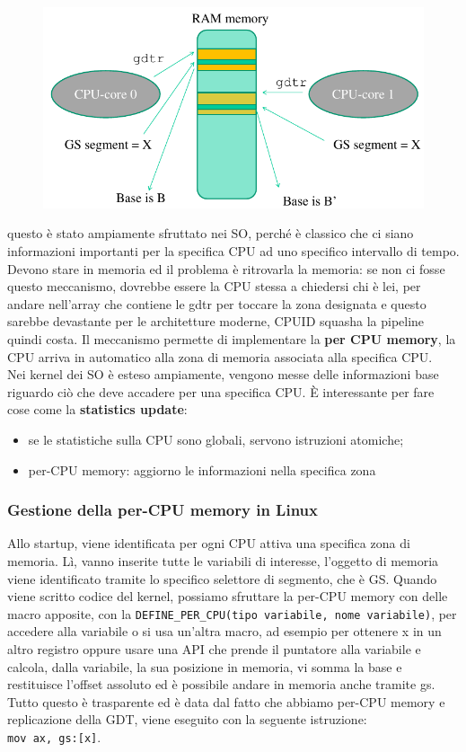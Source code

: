 \documentclass[12pt, oneside]{extbook}
\begin{document}
\begin{figure}[!h]
	\includegraphics[scale=0.4]{immagini/gdtr_schema2.png}
\end{figure}
questo è stato ampiamente sfruttato nei SO, perché è classico che ci siano informazioni importanti per la specifica CPU ad uno specifico intervallo di tempo. Devono stare in memoria ed il problema è ritrovarla la memoria: se non ci fosse questo meccanismo, dovrebbe essere la CPU stessa a chiedersi chi è lei, per andare nell'array che contiene le gdtr per toccare la zona designata e questo sarebbe devastante per le architetture moderne, CPUID squasha la pipeline quindi costa. Il meccanismo permette di implementare la \textbf{per CPU memory}, la CPU arriva in automatico alla zona di memoria associata alla specifica CPU.\\Nei kernel dei SO è esteso ampiamente, vengono messe delle informazioni base riguardo ciò che deve accadere per una specifica CPU. È interessante per fare cose come la \textbf{statistics update}:
\begin{itemize}
\item se le statistiche sulla CPU sono globali, servono istruzioni atomiche;
\item per-CPU memory: aggiorno le informazioni nella specifica zona
\end{itemize}
\subsubsection{Gestione della per-CPU memory in Linux}
Allo startup, viene identificata per ogni CPU attiva una specifica zona di memoria. Lì, vanno inserite tutte le variabili di interesse, l'oggetto di memoria viene identificato tramite lo specifico selettore di segmento, che è GS. Quando viene scritto codice del kernel, possiamo sfruttare la per-CPU memory con delle macro apposite, con la \texttt{DEFINE\_PER\_CPU(tipo variabile, nome variabile)}, per accedere alla variabile o si usa un'altra macro, ad esempio per ottenere x in un altro registro oppure usare una API che prende il puntatore alla variabile e calcola, dalla variabile, la sua posizione in memoria, vi somma la base e restituisce l'offset assoluto ed è possibile andare in memoria anche tramite gs. Tutto questo è trasparente ed è data dal fatto che abbiamo per-CPU memory e replicazione della GDT, viene eseguito con la seguente istruzione:\\
\texttt{mov ax, gs:[x]}.
\end{document}
